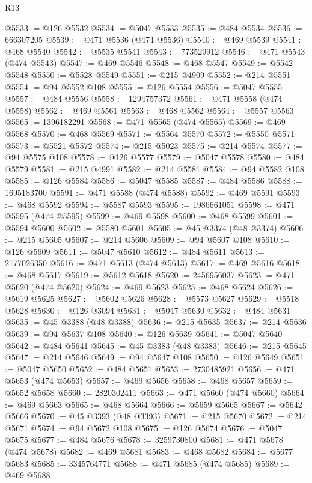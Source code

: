 \begin{lexlean}{R13}
\begin{coremodule}
@5533 := @126 @5532
@5534 := @5047 @5533
@5535 := @484 @5534
@5536 := 666307205
@5539 := @471 @5536 (@474 @5536)
@5540 := @469 @5539
@5541 := @468 @5540
@5542 := @5535 @5541
@5543 := 773529912
@5546 := @471 @5543 (@474 @5543)
@5547 := @469 @5546
@5548 := @468 @5547
@5549 := @5542 @5548
@5550 := @5528 @5549
@5551 := @215 @4909
@5552 := @214 @5551
@5554 := @94 @5552 @108
@5555 := @126 @5554
@5556 := @5047 @5555
@5557 := @484 @5556
@5558 := 1294757372
@5561 := @471 @5558 (@474 @5558)
@5562 := @469 @5561
@5563 := @468 @5562
@5564 := @5557 @5563
@5565 := 1396182291
@5568 := @471 @5565 (@474 @5565)
@5569 := @469 @5568
@5570 := @468 @5569
@5571 := @5564 @5570
@5572 := @5550 @5571
@5573 := @5521 @5572
@5574 := @215 @5023
@5575 := @214 @5574
@5577 := @94 @5575 @108
@5578 := @126 @5577
@5579 := @5047 @5578
@5580 := @484 @5579
@5581 := @215 @4991
@5582 := @214 @5581
@5584 := @94 @5582 @108
@5585 := @126 @5584
@5586 := @5047 @5585
@5587 := @484 @5586
@5588 := 1695183700
@5591 := @471 @5588 (@474 @5588)
@5592 := @469 @5591
@5593 := @468 @5592
@5594 := @5587 @5593
@5595 := 1986661051
@5598 := @471 @5595 (@474 @5595)
@5599 := @469 @5598
@5600 := @468 @5599
@5601 := @5594 @5600
@5602 := @5580 @5601
@5605 := @45 @3374 (@48 @3374)
@5606 := @215 @5605
@5607 := @214 @5606
@5609 := @94 @5607 @108
@5610 := @126 @5609
@5611 := @5047 @5610
@5612 := @484 @5611
@5613 := 2177026350
@5616 := @471 @5613 (@474 @5613)
@5617 := @469 @5616
@5618 := @468 @5617
@5619 := @5612 @5618
@5620 := 2456956037
@5623 := @471 @5620 (@474 @5620)
@5624 := @469 @5623
@5625 := @468 @5624
@5626 := @5619 @5625
@5627 := @5602 @5626
@5628 := @5573 @5627
@5629 := @5518 @5628
@5630 := @126 @3094
@5631 := @5047 @5630
@5632 := @484 @5631
@5635 := @45 @3388 (@48 @3388)
@5636 := @215 @5635
@5637 := @214 @5636
@5639 := @94 @5637 @108
@5640 := @126 @5639
@5641 := @5047 @5640
@5642 := @484 @5641
@5645 := @45 @3383 (@48 @3383)
@5646 := @215 @5645
@5647 := @214 @5646
@5649 := @94 @5647 @108
@5650 := @126 @5649
@5651 := @5047 @5650
@5652 := @484 @5651
@5653 := 2730485921
@5656 := @471 @5653 (@474 @5653)
@5657 := @469 @5656
@5658 := @468 @5657
@5659 := @5652 @5658
@5660 := 2820302411
@5663 := @471 @5660 (@474 @5660)
@5664 := @469 @5663
@5665 := @468 @5664
@5666 := @5659 @5665
@5667 := @5642 @5666
@5670 := @45 @3393 (@48 @3393)
@5671 := @215 @5670
@5672 := @214 @5671
@5674 := @94 @5672 @108
@5675 := @126 @5674
@5676 := @5047 @5675
@5677 := @484 @5676
@5678 := 3259730800
@5681 := @471 @5678 (@474 @5678)
@5682 := @469 @5681
@5683 := @468 @5682
@5684 := @5677 @5683
@5685 := 3345764771
@5688 := @471 @5685 (@474 @5685)
@5689 := @469 @5688

\end{coremodule}
\end{lexlean}
